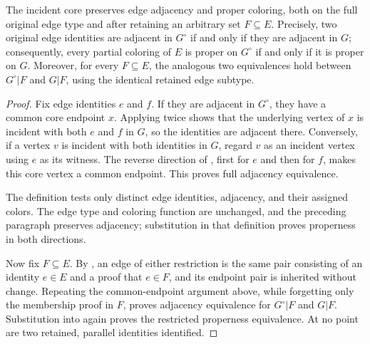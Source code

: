 \begin{lemma}
The incident core preserves edge adjacency and proper coloring, both on the
full original edge type and after retaining an arbitrary set $F\subseteq E$.
Precisely, two original edge identities are adjacent in $G^{\circ}$ if and
only if they are adjacent in $G$; consequently, every partial coloring of
$E$ is proper on $G^{\circ}$ if and only if it is proper on $G$.  Moreover,
for every $F\subseteq E$, the analogous two equivalences hold between
$G^{\circ}|F$ and $G|F$, using the identical retained edge subtype.
\end{lemma}
\begin{proof}
Fix edge identities $e$ and $f$.  If they are adjacent in $G^{\circ}$,
they have a common core endpoint $x$.  Applying
 twice shows that the underlying vertex of
$x$ is incident with both $e$ and $f$ in $G$, so the identities are adjacent
there.  Conversely, if a vertex $v$ is incident with both identities in
$G$, regard $v$ as an incident vertex using $e$ as its witness.  The reverse
direction of , first for $e$ and then for
$f$, makes this core vertex a common endpoint.  This proves full adjacency
equivalence.

The definition  tests only distinct edge
identities, adjacency, and their assigned colors.  The edge type and coloring
function are unchanged, and the preceding paragraph preserves adjacency;
substitution in that definition proves properness in both directions.

Now fix $F\subseteq E$.  By , an edge of either
restriction is the same pair consisting of an identity $e\in E$ and a proof
that $e\in F$, and its endpoint pair is inherited without change.  Repeating
the common-endpoint argument above, while forgetting only the membership
proof in $F$, proves adjacency equivalence for $G^{\circ}|F$ and $G|F$.
Substitution into  again proves the restricted
properness equivalence.  At no point are two retained, parallel identities
identified.
\end{proof}

